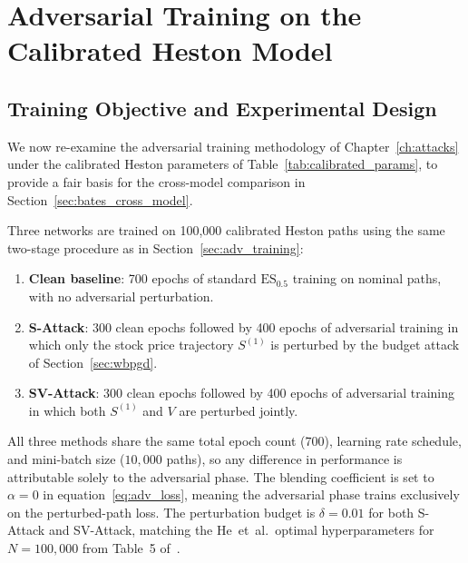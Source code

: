 \section{Adversarial Training on the Calibrated Heston Model}
\label{sec:bates_adv_training}

\subsection{Training Objective and Experimental Design}
\label{sec:bates_adv_obj}

We now re-examine the adversarial training methodology of
Chapter~\ref{ch:attacks} under the calibrated Heston parameters of
Table~\ref{tab:calibrated_params}, to provide a fair basis for the
cross-model comparison in Section~\ref{sec:bates_cross_model}.

Three networks are trained on 100{,}000 calibrated Heston paths using the
same two-stage procedure as in Section~\ref{sec:adv_training}:

\begin{enumerate}
  \item \textbf{Clean baseline}: 700 epochs of standard $\mathrm{ES}_{0.5}$
    training on nominal paths, with no adversarial perturbation.
  \item \textbf{S-Attack}: 300 clean epochs followed by 400 epochs of
    adversarial training in which only the stock price trajectory
    $S^{(1)}$ is perturbed by the budget attack of
    Section~\ref{sec:wbpgd}.
  \item \textbf{SV-Attack}: 300 clean epochs followed by 400 epochs of
    adversarial training in which both $S^{(1)}$ and $V$ are perturbed
    jointly.
\end{enumerate}

All three methods share the same total epoch count (700), learning rate
schedule, and mini-batch size ($10{,}000$ paths), so any difference in
performance is attributable solely to the adversarial phase.  The
blending coefficient is set to $\alpha = 0$ in
equation~\eqref{eq:adv_loss}, meaning the adversarial phase trains
exclusively on the perturbed-path loss.  The perturbation budget is
$\delta = 0.01$ for both S-Attack and SV-Attack, matching the He~et~al.\
optimal hyperparameters for $N = 100{,}000$ from
Table~5 of~\citep{he2025}.

